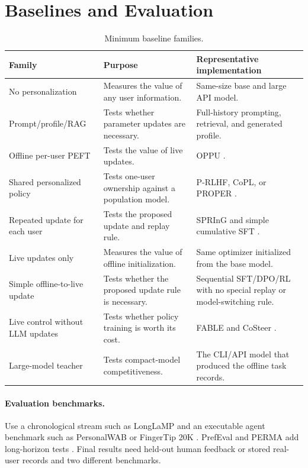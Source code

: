 \documentclass[11pt]{article}
\begin{document}
\section{Baselines and Evaluation}
\label{sec:baselines}

\begin{table}[t]
  \centering
  \caption{Minimum baseline families.}
  \label{tab:baselines}
  \small
  \begin{tabularx}{\textwidth}{@{}L{0.23\textwidth}YY@{}}
    \toprule
    Family & Purpose & Representative implementation \\
    \midrule
    No personalization &
    Measures the value of any user information. &
    Same-size base and large API model. \\
    Prompt/profile/RAG &
    Tests whether parameter updates are necessary. &
    Full-history prompting, retrieval, and generated profile. \\
    Offline per-user PEFT &
    Tests the value of live updates. &
    OPPU \citep{tan2024oppu}. \\
    Shared personalized policy &
    Tests one-user ownership against a population model. &
    P-RLHF, CoPL, or PROPER
    \citep{li2024personalized,choi2025copl,zhang2025proper}. \\
    Repeated update for each user &
    Tests the proposed update and replay rule. &
    SPRInG and simple cumulative SFT \citep{kim2026spring}. \\
    Live updates only &
    Measures the value of offline initialization. &
    Same optimizer initialized from the base model. \\
    Simple offline-to-live update &
    Tests whether the proposed update rule is necessary. &
    Sequential SFT/DPO/RL with no special replay or model-switching rule. \\
    Live control without LLM updates &
    Tests whether policy training is worth its cost. &
    FABLE and CoSteer \citep{jin2026fable,lv2025costeer}. \\
    Large-model teacher &
    Tests compact-model competitiveness. &
    The CLI/API model that produced the offline task records. \\
    \bottomrule
  \end{tabularx}
\end{table}

\paragraph{Evaluation benchmarks.}
Use a chronological stream such as LongLaMP \citep{kumar2024longlamp} and an
executable agent benchmark such as PersonalWAB or FingerTip 20K
\citep{cai2025personalwab,yang2026fingertip}.  PrefEval and PERMA add
long-horizon tests \citep{zhao2025prefeval,liu2026perma}.  Final results need
held-out human feedback or stored real-user records and two different
benchmarks.
\end{document}
